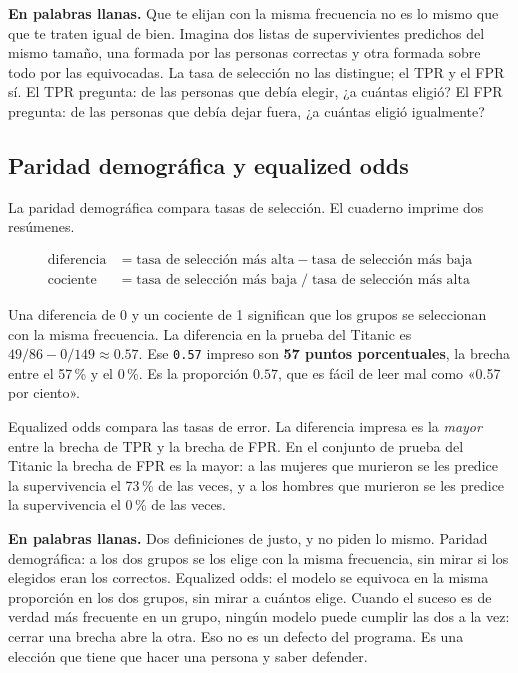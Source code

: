 \documentclass[11pt]{article}
\newcommand{\fn}[1]{\texttt{\small #1}}
\newcommand{\pct}[1]{\mbox{#1\,\%}}
\begin{document}
\begin{plainwords}
\textbf{En palabras llanas.} Que te elijan con la misma frecuencia no es lo mismo que que te traten igual de bien. Imagina dos listas de supervivientes predichos del mismo tamaño, una formada por las personas correctas y otra formada sobre todo por las equivocadas. La tasa de selección no las distingue; el TPR y el FPR sí. El TPR pregunta: de las personas que debía elegir, ¿a cuántas eligió? El FPR pregunta: de las personas que debía dejar fuera, ¿a cuántas eligió igualmente?
\end{plainwords}

\subsection{Paridad demográfica y equalized odds}

La paridad demográfica compara tasas de selección. El cuaderno imprime dos resúmenes.

\[
\begin{aligned}
\text{diferencia} &= \text{tasa de selección más alta} - \text{tasa de selección más baja} \\
\text{cociente} &= \text{tasa de selección más baja} \;/\; \text{tasa de selección más alta}
\end{aligned}
\]

Una diferencia de 0 y un cociente de 1 significan que los grupos se seleccionan con la misma frecuencia. La diferencia en la prueba del Titanic es \(49/86 - 0/149 \approx 0.57\). Ese \fn{0.57} impreso son \textbf{57 puntos porcentuales}, la brecha entre el \pct{57} y el \pct{0}. Es la proporción \(0.57\), que es fácil de leer mal como «0.57 por ciento».

Equalized odds compara las tasas de error. La diferencia impresa es la \emph{mayor} entre la brecha de TPR y la brecha de FPR. En el conjunto de prueba del Titanic la brecha de FPR es la mayor: a las mujeres que murieron se les predice la supervivencia el \pct{73} de las veces, y a los hombres que murieron se les predice la supervivencia el \pct{0} de las veces.

\begin{plainwords}
\textbf{En palabras llanas.} Dos definiciones de justo, y no piden lo mismo. Paridad demográfica: a los dos grupos se los elige con la misma frecuencia, sin mirar si los elegidos eran los correctos. Equalized odds: el modelo se equivoca en la misma proporción en los dos grupos, sin mirar a cuántos elige. Cuando el suceso es de verdad más frecuente en un grupo, ningún modelo puede cumplir las dos a la vez: cerrar una brecha abre la otra. Eso no es un defecto del programa. Es una elección que tiene que hacer una persona y saber defender.
\end{plainwords}
\end{document}
